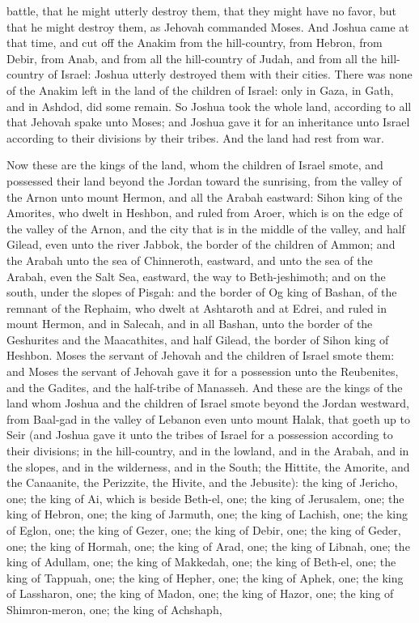 battle, that he might utterly destroy them, that they might have no favor, but that he might destroy them, as Jehovah commanded Moses.  And Joshua came at that time, and cut off the Anakim from the hill-country, from Hebron, from Debir, from Anab, and from all the hill-country of Judah, and from all the hill-country of Israel: Joshua utterly destroyed them with their cities. There was none of the Anakim left in the land of the children of Israel: only in Gaza, in Gath, and in Ashdod, did some remain. So Joshua took the whole land, according to all that Jehovah spake unto Moses; and Joshua gave it for an inheritance unto Israel according to their divisions by their tribes. And the land had rest from war. 

Now these are the kings of the land, whom the children of Israel smote, and possessed their land beyond the Jordan toward the sunrising, from the valley of the Arnon unto mount Hermon, and all the Arabah eastward: Sihon king of the Amorites, who dwelt in Heshbon, and ruled from Aroer, which is on the edge of the valley of the Arnon, and the city that is in the middle of the valley, and half Gilead, even unto the river Jabbok, the border of the children of Ammon; and the Arabah unto the sea of Chinneroth, eastward, and unto the sea of the Arabah, even the Salt Sea, eastward, the way to Beth-jeshimoth; and on the south, under the slopes of Pisgah: and the border of Og king of Bashan, of the remnant of the Rephaim, who dwelt at Ashtaroth and at Edrei, and ruled in mount Hermon, and in Salecah, and in all Bashan, unto the border of the Geshurites and the Maacathites, and half Gilead, the border of Sihon king of Heshbon. Moses the servant of Jehovah and the children of Israel smote them: and Moses the servant of Jehovah gave it for a possession unto the Reubenites, and the Gadites, and the half-tribe of Manasseh.  And these are the kings of the land whom Joshua and the children of Israel smote beyond the Jordan westward, from Baal-gad in the valley of Lebanon even unto mount Halak, that goeth up to Seir (and Joshua gave it unto the tribes of Israel for a possession according to their divisions; in the hill-country, and in the lowland, and in the Arabah, and in the slopes, and in the wilderness, and in the South; the Hittite, the Amorite, and the Canaanite, the Perizzite, the Hivite, and the Jebusite): the king of Jericho, one; the king of Ai, which is beside Beth-el, one; the king of Jerusalem, one; the king of Hebron, one; the king of Jarmuth, one; the king of Lachish, one; the king of Eglon, one; the king of Gezer, one; the king of Debir, one; the king of Geder, one; the king of Hormah, one; the king of Arad, one; the king of Libnah, one; the king of Adullam, one; the king of Makkedah, one; the king of Beth-el, one; the king of Tappuah, one; the king of Hepher, one; the king of Aphek, one; the king of Lassharon, one; the king of Madon, one; the king of Hazor, one; the king of Shimron-meron, one; the king of Achshaph, 